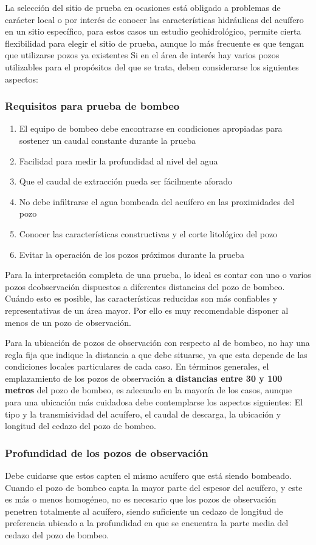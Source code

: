 La selección del sitio de prueba en ocasiones está obligado a problemas de carácter local o por interés de conocer las características hidráulicas del acuífero en un sitio específico, para estos casos un estudio geohidrológico, permite cierta flexibilidad para elegir el sitio de prueba, aunque lo más frecuente es que tengan que utilizarse pozos ya existentes Si en el área de interés hay varios pozos utilizables para el propósitos del que se trata, deben considerarse los siguientes aspectos:
\subsubsection{Requisitos para prueba de bombeo} 
\begin{enumerate}
    \item El equipo de bombeo debe encontrarse en condiciones apropiadas para sostener un caudal constante durante la prueba
    \item Facilidad para medir la profundidad al nivel del agua
    \item Que el caudal de extracción pueda ser fácilmente aforado
    \item No debe infiltrarse el agua bombeada del acuífero en las proximidades del pozo
    \item Conocer las características constructivas y el corte litológico del pozo
    \item Evitar la operación de los pozos próximos durante la prueba
\end{enumerate}
Para la interpretación completa de una prueba, lo ideal es contar con uno o varios pozos deobservación dispuestos a diferentes distancias del pozo de bombeo. Cuándo esto es posible, las características reducidas son más confiables y representativas de un área mayor. Por ello es muy recomendable disponer al menos de un pozo de observación.

Para la ubicación de pozos de observación con respecto al de bombeo, no hay una regla fija que indique la distancia a que debe situarse, ya que esta depende de las condiciones locales particulares de cada caso. En términos generales, el emplazamiento de los pozos de observación \textbf{a distancias entre 30 y 100 metros} del pozo de bombeo, es adecuado en la mayoría de los casos, aunque para una ubicación más cuidadosa debe contemplarse los aspectos siguientes: El tipo y la transmisividad del acuífero, el caudal de descarga, la ubicación y longitud del cedazo del pozo de bombeo.
\subsubsection{Profundidad de los pozos de observación}
Debe cuidarse que estos capten el mismo acuífero que está siendo bombeado. Cuando el pozo de bombeo capta la mayor parte del espesor del acuífero, y este es más o menos homogéneo, no es necesario que los pozos de observación penetren totalmente al acuífero, siendo suficiente un cedazo de longitud de preferencia ubicado a la profundidad en que se encuentra la parte media del cedazo del pozo de bombeo.
